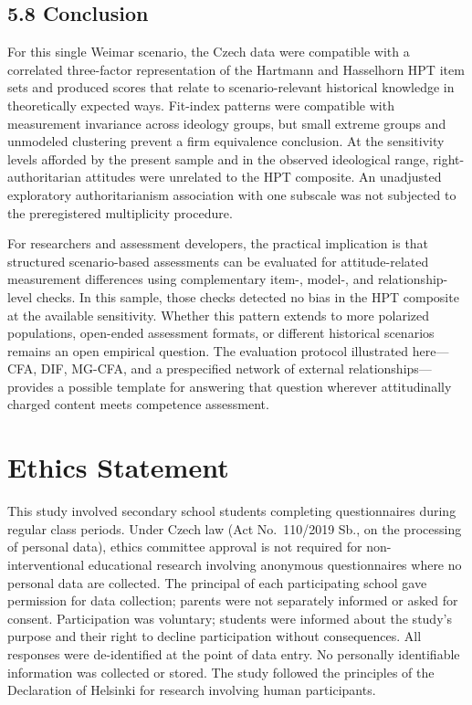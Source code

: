 \documentclass[PCJ,Unicode,screen,mode=plain]{cedram}
\begin{document}
\subsection*{5.8 Conclusion}\label{conclusion}

For this single Weimar scenario, the Czech data were compatible with a
correlated three-factor representation of the Hartmann and Hasselhorn HPT item
sets and produced scores that relate to scenario-relevant historical knowledge
in theoretically expected ways. Fit-index patterns were compatible with measurement
invariance across ideology groups, but small extreme groups and unmodeled
clustering prevent a firm equivalence conclusion. At the
sensitivity levels afforded by the present sample and in the observed
ideological range, right-authoritarian attitudes were unrelated to the
HPT composite. An unadjusted exploratory authoritarianism association
with one subscale was not subjected to the preregistered multiplicity
procedure.

For researchers and assessment developers, the practical implication
is that structured scenario-based assessments can be evaluated for
attitude-related measurement differences using complementary item-, model-,
and relationship-level checks. In this sample, those checks detected no bias
in the HPT composite at the available sensitivity. Whether this pattern extends to more polarized
populations, open-ended assessment formats, or different historical
scenarios remains an open empirical question. The evaluation protocol
illustrated here---CFA, DIF, MG-CFA, and a prespecified network of
external relationships---provides a possible template for answering that
question wherever attitudinally charged content meets competence
assessment.

\section*{Ethics Statement}\label{ethics-statement}

This study involved secondary school students completing questionnaires during regular class periods. Under Czech law (Act No.~110/2019 Sb., on the processing of personal data), ethics committee approval is not required for non-interventional educational research involving anonymous questionnaires where no personal data are collected. The principal of each participating school gave permission for data collection; parents were not separately informed or asked for consent. Participation was voluntary; students were informed about the study's purpose and their right to decline participation without consequences. All responses were de-identified at the point of data entry. No personally identifiable information was collected or stored. The study followed the principles of the Declaration of Helsinki for research involving human participants.
\end{document}
